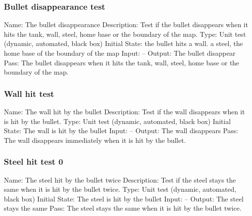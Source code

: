 \documentclass{article}
\begin{document}
\subsubsection{Bullet disappearance test}
Name:  The bullet disappearance \newline
Description: Test if the bullet disappears when it hits the tank, wall, steel, home base or the boundary of the map. \newline
Type: Unit test (dynamic, automated, black box) \newline
Initial State:  the bullet hits a wall. a steel, the home base of the boundary of the map\newline
Input: --\newline
Output: The bullet disappear\newline
Pass: The bullet disappears when it hits the tank, wall, steel, home base or the boundary of the map. \newline

\subsubsection{Wall hit test}
Name:  The wall hit by the bullet\newline
Description: Test if the wall disappears when it is hit by the bullet. \newline
Type: Unit test (dynamic, automated, black box) \newline
Initial State:  The wall is hit by the bullet \newline
Input: --\newline
Output: The wall disappears \newline
Pass:  The wall disappears immediately when it is hit by the bullet. \newline

\subsubsection{Steel hit test 0}
Name:  The steel hit by the bullet twice\newline
Description: Test if the steel stays the same when it is hit by the bullet twice. \newline
Type: Unit test (dynamic, automated, black box) \newline
Initial State:  The steel is hit by the bullet \newline
Input: --\newline
Output: The steel stays the same \newline
Pass:  The steel stays the same when it is hit by the bullet twice. \newline
\end{document}
